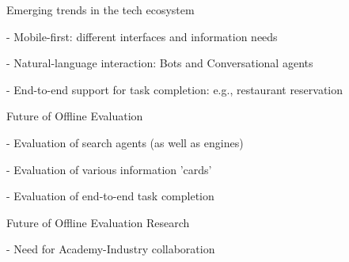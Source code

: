 \documentclass[openany]{now} %
\newcommand{\newpar}{\bigskip\noindent}
\begin{document}
Emerging trends in the tech ecosystem

- Mobile-first: different interfaces and information needs

- Natural-language interaction: Bots and Conversational agents

- End-to-end support for task completion: e.g., restaurant reservation 

\newpar
Future of Offline Evaluation

- Evaluation of search agents (as well as engines)

- Evaluation of various information 'cards'

- Evaluation of end-to-end task completion

\newpar
Future of Offline Evaluation Research

- Need for Academy-Industry collaboration

\backmatter  %



	
\end{document}
